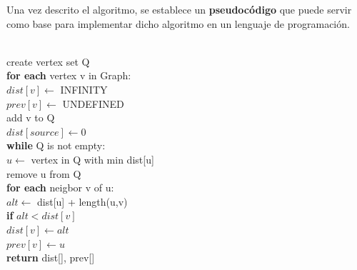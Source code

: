 \documentclass[10pt]{article}
\begin{document}

Una vez descrito el algoritmo, se establece un \textbf{pseudocódigo} que puede servir como base para implementar dicho algoritmo en un lenguaje de programación.

\begin{algorithm}[H]
\begin{algorithmic}
 \\
	\quad create vertex set Q \\
	\quad \textbf{for each} vertex v in Graph:  \\
		\qquad $dist[v] \gets$ INFINITY  \\
		\qquad $prev[v] \gets$ UNDEFINED  \\
		\qquad add v to Q  \\
	\quad $dist[source] \gets 0 $  \\
	\quad \textbf{while} Q is not empty: \\
		\qquad $u \gets$ vertex in Q with min dist[u]  \\
		\qquad remove u from Q \\
		\qquad \textbf{for each} neigbor v of u:  \\
			\quad \qquad $alt \gets$ dist[u] + length(u,v) \\
			\quad \qquad \textbf{if} $alt < dist[v]$  \\
				\qquad \qquad $dist[v] \gets alt$ \\
				\qquad \qquad $prev[v] \gets u$ \\
	\quad \textbf{return} dist[], prev[]
\EndFunction
\end{algorithmic}
\end{algorithm}
\end{document}
